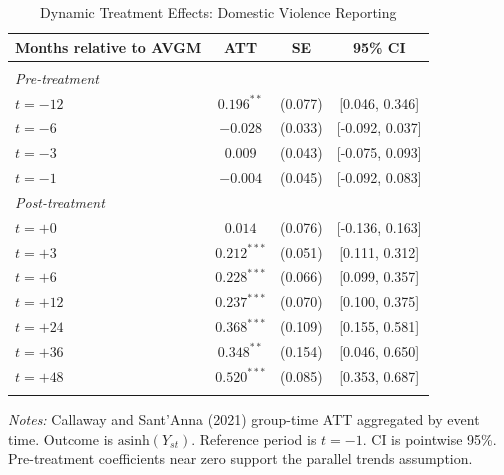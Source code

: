 \begin{table}[!t]
\centering
\caption{Dynamic Treatment Effects: Domestic Violence Reporting}
\label{tab:eventstudy}
\begin{threeparttable}
\begin{tabular}{lccc}
\hline\hline
Months relative to AVGM & ATT & SE & 95\% CI \\
\hline
\\[-1.8ex]
\multicolumn{4}{l}{\textit{Pre-treatment}} \\
$t = -12$ & $0.196^{**}$ & (0.077) & [0.046, 0.346] \\
$t = -6$ & $-0.028$ & (0.033) & [-0.092, 0.037] \\
$t = -3$ & $0.009$ & (0.043) & [-0.075, 0.093] \\
$t = -1$ & $-0.004$ & (0.045) & [-0.092, 0.083] \\
\hline
\multicolumn{4}{l}{\textit{Post-treatment}} \\
$t = +0$ & $0.014$ & (0.076) & [-0.136, 0.163] \\
$t = +3$ & $0.212^{***}$ & (0.051) & [0.111, 0.312] \\
$t = +6$ & $0.228^{***}$ & (0.066) & [0.099, 0.357] \\
$t = +12$ & $0.237^{***}$ & (0.070) & [0.100, 0.375] \\
$t = +24$ & $0.368^{***}$ & (0.109) & [0.155, 0.581] \\
$t = +36$ & $0.348^{**}$ & (0.154) & [0.046, 0.650] \\
$t = +48$ & $0.520^{***}$ & (0.085) & [0.353, 0.687] \\
\\[-1.8ex]
\hline\hline
\end{tabular}
\begin{tablenotes}
\item \textit{Notes:} Callaway and Sant'Anna (2021) group-time ATT aggregated by event time. Outcome is $\text{asinh}(Y_{st})$. Reference period is $t = -1$. CI is pointwise 95\%. Pre-treatment coefficients near zero support the parallel trends assumption.
\end{tablenotes}
\end{threeparttable}
\end{table}

